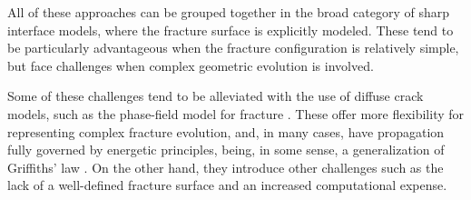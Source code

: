     All of these approaches can be grouped together in the broad category of sharp interface models, where the fracture surface is explicitly modeled. These tend to be particularly advantageous when the fracture configuration is relatively simple, but face challenges when complex geometric evolution is involved. 
    
    Some of these challenges tend to be alleviated with the use of diffuse crack models, such as the phase-field model for fracture \cite{francfort1998revisiting, bourdin2000numerical, karma2001phase}. These offer more flexibility for representing complex fracture evolution, and, in many cases, have propagation fully governed by energetic principles, being, in some sense, a generalization of Griffiths' law \cite{griffith1921vi}. On the other hand, they introduce other challenges such as the lack of a well-defined fracture surface and an increased computational expense\cite{heider2021review}.  






